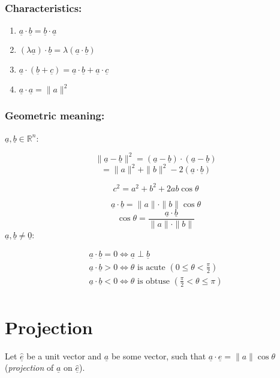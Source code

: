 \documentclass[00_complete]{subfiles}
\begin{document}
\subsubsection{Characteristics:}
\begin{enumerate}
    \item $\underline a \cdot \underline b = \underline b \cdot \underline a$
    \item $(\lambda \underline a) \cdot \underline b = \lambda (\underline a \cdot
   \underline b)$
    \item $\underline a \cdot (\underline b + \underline c) = \underline a \cdot
   \underline b + \underline a \cdot \underline c$
    \item $\underline a \cdot \underline a = \|a\|^2$
\end{enumerate}
\subsubsection{Geometric meaning:}

$\underline a, \underline b \in \mathbb{R}^n$:

$$\|\underline a - \underline b\|^2=(\underline a - \underline
b)\cdot(\underline a - \underline b)$$
$$=\|a\|^2+\|b\|^2 - 2(\underline a \cdot \underline b)$$
\begin{reminder}
$$c^2=a^2+b^2+2ab\cos \theta$$
\end{reminder}
\begin{conclusion}
$$\underline a \cdot \underline b = \|a\| \cdot \|b\| \cos \theta$$
$$\cos \theta = \frac{\underline a \cdot \underline b}{\|a\|\cdot\|b\|}$$
$\underline a, \underline  b \neq \underline 0$:

$$
\begin{gathered}
    \underline a \cdot \underline b = 0 \iff \underline a \perp \underline b \\
    \underline a \cdot \underline b > 0 \iff \theta \text{ is acute } \left(0 \leq
    \theta < \frac{\pi}{2}\right)\\
    \underline a \cdot \underline b < 0 \iff \theta \text{ is obtuse } \left(\frac{\pi}{2} < \theta \leq \pi\right)\\
\end{gathered}
$$
\end{conclusion}
\section{Projection}
Let $\underline{\hat e}$ be a unit vector and $\underline a$ be some vector,
such that $\underline a \cdot \underline e = \|a\|\cos \theta$
(\emph{projection} of $\underline a$ on $\underline{\hat e}$).
\end{document}
